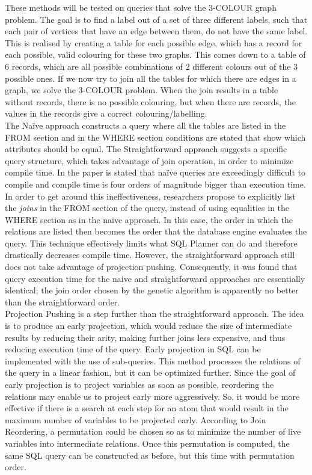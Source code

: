 These methods will be tested on queries that solve the 3-COLOUR graph problem. The goal is to find a label out of a set of three different labels, such that each pair of vertices that have an edge between them, do not have the same label. This is realised by creating a table for each possible edge, which has a record for each possible, valid colouring for these two graphs. This comes down to a table of 6 records, which are all possible combinations of 2 different colours out of the 3 possible ones. If we now try to join all the tables for which there are edges in a graph, we solve the 3-COLOUR problem. When the join results in a table without records, there is no possible colouring, but when there are records, the values in the records give a correct colouring/labelling. \\

The Na\"ive approach constructs a query where all the tables are listed in the FROM section and in the WHERE section conditions are stated that show which attributes should be equal. The Straightforward approach suggests a specific query structure, which takes advantage of join operation, in order to minimize compile time. In the paper is stated that na\"ive queries are exceedingly difficult to compile and compile time is four orders of magnitude bigger than execution time. In order to get around this ineffectiveness, researchers propose to explicitly list the \textit{joins} in the FROM section of the query, instead of using equalities in the WHERE section as in the naive approach. In this case, the order in which the relations are listed then becomes the order that the database engine evaluates the query. This technique effectively limits what SQL Planner can do and therefore drastically decreases compile time. However, the straightforward approach still does not take advantage of projection pushing. Consequently, it was found that query execution time for the naive and straightforward approaches are essentially identical; the join order chosen by the genetic algorithm is apparently no better than the straightforward order. \\

Projection Pushing is a step further than the straightforward approach. The idea is to produce an early projection, which would reduce the size of intermediate results by reducing their arity, making further joins less expensive, and thus reducing execution time of the query. Early projection in SQL can be implemented with the use of sub-queries. This method processes the relations of the query in a linear fashion, but it can be optimized further. Since the goal of early projection is to project variables as soon as possible, reordering the relations may enable us to project early more aggressively. So, it would be more effective if there is a search at each step for an atom that would result in the maximum number of variables to be projected early. According to Join Reordering, a permutation could be chosen so as to minimize the number of live variables into intermediate relations. Once this permutation is computed, the same SQL query can be constructed as before, but this time with permutation order. \\